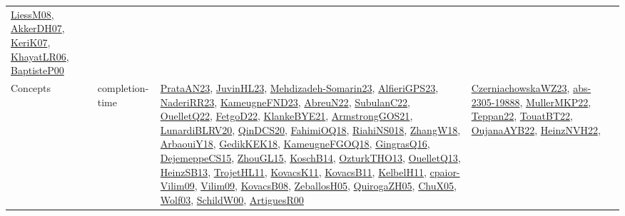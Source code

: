 {\begin{longtable}{lp{3cm}>{\raggedright}p{6cm}>{\raggedright}p{6cm}p{8cm}}
\href{articles/LiessM08.pdf}{LiessM08}\cite{LiessM08}, \href{papers/AkkerDH07.pdf}{AkkerDH07}\cite{AkkerDH07}, \href{papers/KeriK07.pdf}{KeriK07}\cite{KeriK07}, \href{articles/KhayatLR06.pdf}{KhayatLR06}\cite{KhayatLR06}, \href{articles/BaptisteP00.pdf}{BaptisteP00}\cite{BaptisteP00}\\
Concepts & completion-time & \href{articles/PrataAN23.pdf}{PrataAN23}\cite{PrataAN23}, \href{papers/JuvinHL23.pdf}{JuvinHL23}\cite{JuvinHL23}, \href{papers/Mehdizadeh-Somarin23.pdf}{Mehdizadeh-Somarin23}\cite{Mehdizadeh-Somarin23}, \href{articles/AlfieriGPS23.pdf}{AlfieriGPS23}\cite{AlfieriGPS23}, \href{articles/NaderiRR23.pdf}{NaderiRR23}\cite{NaderiRR23}, \href{papers/KameugneFND23.pdf}{KameugneFND23}\cite{KameugneFND23}, \href{articles/AbreuN22.pdf}{AbreuN22}\cite{AbreuN22}, \href{articles/SubulanC22.pdf}{SubulanC22}\cite{SubulanC22}, \href{papers/OuelletQ22.pdf}{OuelletQ22}\cite{OuelletQ22}, \href{articles/FetgoD22.pdf}{FetgoD22}\cite{FetgoD22}, \href{papers/KlankeBYE21.pdf}{KlankeBYE21}\cite{KlankeBYE21}, \href{papers/ArmstrongGOS21.pdf}{ArmstrongGOS21}\cite{ArmstrongGOS21}, \href{articles/LunardiBLRV20.pdf}{LunardiBLRV20}\cite{LunardiBLRV20}, \href{articles/QinDCS20.pdf}{QinDCS20}\cite{QinDCS20}, \href{articles/FahimiOQ18.pdf}{FahimiOQ18}\cite{FahimiOQ18}, \href{papers/RiahiNS018.pdf}{RiahiNS018}\cite{RiahiNS018}, \href{articles/ZhangW18.pdf}{ZhangW18}\cite{ZhangW18}, \href{papers/ArbaouiY18.pdf}{ArbaouiY18}\cite{ArbaouiY18}, \href{articles/GedikKEK18.pdf}{GedikKEK18}\cite{GedikKEK18}, \href{papers/KameugneFGOQ18.pdf}{KameugneFGOQ18}\cite{KameugneFGOQ18}, \href{papers/GingrasQ16.pdf}{GingrasQ16}\cite{GingrasQ16}, \href{papers/DejemeppeCS15.pdf}{DejemeppeCS15}\cite{DejemeppeCS15}, \href{papers/ZhouGL15.pdf}{ZhouGL15}\cite{ZhouGL15}, \href{papers/KoschB14.pdf}{KoschB14}\cite{KoschB14}, \href{articles/OzturkTHO13.pdf}{OzturkTHO13}\cite{OzturkTHO13}, \href{papers/OuelletQ13.pdf}{OuelletQ13}\cite{OuelletQ13}, \href{articles/HeinzSB13.pdf}{HeinzSB13}\cite{HeinzSB13}, \href{articles/TrojetHL11.pdf}{TrojetHL11}\cite{TrojetHL11}, \href{articles/KovacsK11.pdf}{KovacsK11}\cite{KovacsK11}, \href{articles/KovacsB11.pdf}{KovacsB11}\cite{KovacsB11}, \href{articles/KelbelH11.pdf}{KelbelH11}\cite{KelbelH11}, \href{papers/cpaior-Vilim09.pdf}{cpaior-Vilim09}\cite{cpaior-Vilim09}, \href{papers/Vilim09.pdf}{Vilim09}\cite{Vilim09}, \href{articles/KovacsB08.pdf}{KovacsB08}\cite{KovacsB08}, \href{articles/ZeballosH05.pdf}{ZeballosH05}\cite{ZeballosH05}, \href{papers/QuirogaZH05.pdf}{QuirogaZH05}\cite{QuirogaZH05}, \href{papers/ChuX05.pdf}{ChuX05}\cite{ChuX05}, \href{papers/Wolf03.pdf}{Wolf03}\cite{Wolf03}, \href{articles/SchildW00.pdf}{SchildW00}\cite{SchildW00}, \href{articles/ArtiguesR00.pdf}{ArtiguesR00}\cite{ArtiguesR00} & \href{articles/CzerniachowskaWZ23.pdf}{CzerniachowskaWZ23}\cite{CzerniachowskaWZ23}, \href{articles/abs-2305-19888.pdf}{abs-2305-19888}\cite{abs-2305-19888}, \href{articles/MullerMKP22.pdf}{MullerMKP22}\cite{MullerMKP22}, \href{papers/Teppan22.pdf}{Teppan22}\cite{Teppan22}, \href{papers/TouatBT22.pdf}{TouatBT22}\cite{TouatBT22}, \href{papers/OujanaAYB22.pdf}{OujanaAYB22}\cite{OujanaAYB22}, \href{articles/HeinzNVH22.pdf}{HeinzNVH22}\cite{HeinzNVH22}, 
\end{longtable}}
